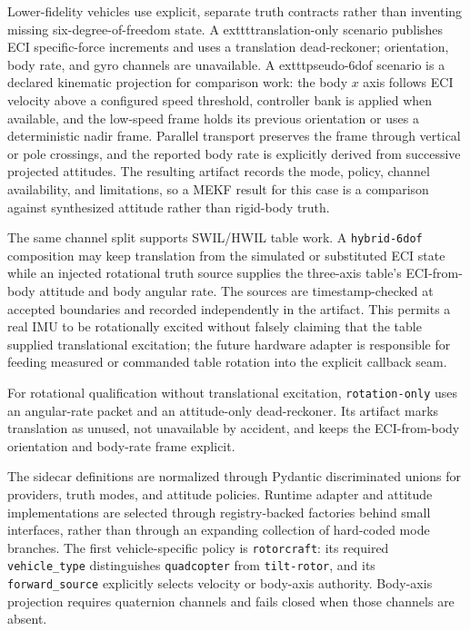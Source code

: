 \documentclass[11pt]{article}
\begin{document}
Lower-fidelity vehicles use explicit, separate truth contracts rather than
inventing missing six-degree-of-freedom state. A 	exttt{translation-only}
scenario publishes ECI specific-force increments and uses a translation
dead-reckoner; orientation, body rate, and gyro channels are unavailable. A
	exttt{pseudo-6dof} scenario is a declared kinematic projection for comparison
work: the body $x$ axis follows ECI velocity above a configured speed
threshold, controller bank is applied when available, and the low-speed frame
holds its previous orientation or uses a deterministic nadir frame. Parallel
transport preserves the frame through vertical or pole crossings, and the
reported body rate is explicitly derived from successive projected attitudes.
The resulting artifact records the mode, policy, channel availability, and
limitations, so a MEKF result for this case is a comparison against synthesized
attitude rather than rigid-body truth.

The same channel split supports SWIL/HWIL table work. A
\texttt{hybrid-6dof} composition may keep translation from the simulated or
substituted ECI state while an injected rotational truth source supplies the
three-axis table's ECI-from-body attitude and body angular rate. The sources
are timestamp-checked at accepted boundaries and recorded independently in the
artifact. This permits a real IMU to be rotationally excited without falsely
claiming that the table supplied translational excitation; the future hardware
adapter is responsible for feeding measured or commanded table rotation into
the explicit callback seam.

For rotational qualification without translational excitation,
\texttt{rotation-only} uses an angular-rate packet and an attitude-only
dead-reckoner. Its artifact marks translation as unused, not unavailable by
accident, and keeps the ECI-from-body orientation and body-rate frame explicit.

The sidecar definitions are normalized through Pydantic discriminated unions
for providers, truth modes, and attitude policies. Runtime adapter and
attitude implementations are selected through registry-backed factories behind
small interfaces, rather than through an expanding collection of hard-coded
mode branches. The first vehicle-specific policy is \texttt{rotorcraft}: its
required \texttt{vehicle\_type} distinguishes \texttt{quadcopter} from
\texttt{tilt-rotor}, and its \texttt{forward\_source} explicitly selects
velocity or body-axis authority. Body-axis projection requires quaternion
channels and fails closed when those channels are absent.
\end{document}
